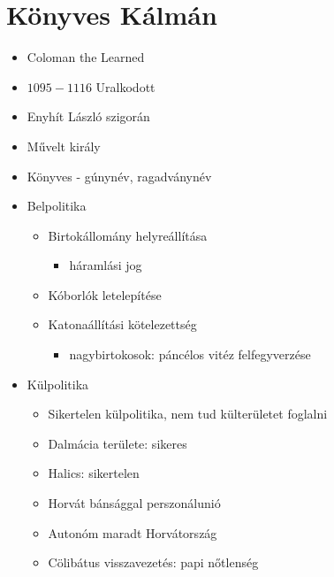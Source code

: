 \documentclass{article}
\begin{document}
\section{Könyves Kálmán}
\begin{itemize}
    \item Coloman the Learned
    \item $1095-1116$ Uralkodott
    \item Enyhít László szigorán
    \item Művelt király
    \item Könyves - gúnynév, ragadványnév 
    \item Belpolitika
    \begin{itemize}
        \item Birtokállomány helyreállítása
        \begin{itemize}
            \item háramlási jog
        \end{itemize}
        \item Kóborlók letelepítése
        \item Katonaállítási kötelezettség
        \begin{itemize}
            \item nagybirtokosok: páncélos vitéz felfegyverzése
        \end{itemize}
    \end{itemize}
    \item Külpolitika
    \begin{itemize}
        \item Sikertelen külpolitika, nem tud külterületet foglalni
        \item Dalmácia területe: sikeres
        \item Halics: sikertelen
        \item Horvát bánsággal perszonálunió
        \item Autonóm maradt Horvátország
        \item Cölibátus visszavezetés: papi nőtlenség
    \end{itemize}
\end{itemize}
\end{document}
